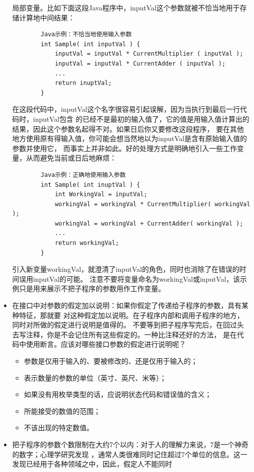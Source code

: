 \documentclass{article}
\begin{document}
\begin{itemize}
    局部变量。比如下面这段Java程序中，inputVal这个参数就被不恰当地用于存储计算地中间结果：
    \begin{lstlisting}
        Java示例：不恰当地使用输入参数
        int Sample( int inputVal ) {
            inputVal = inputVal * CurrentMultiplier ( inputVal );
            inputVal = inputVal * CurrentAdder ( inputVal );
            ...
            return inuptVal;
        }
    \end{lstlisting}
    在这段代码中，inputVal这个名字很容易引起误解，因为当执行到最后一行代码时，inputVal包含
    的已经不是最初的输入值了，它的值是用输入值计算出的结果，因此这个参数名起得不对。如果日后你又要修改这段程序，
    要在其他地方使用原有得输入值，你可能会想当然地以为inputVal是含有原始输入值的参数并使用它，
    而事实上并非如此。好的处理方式是明确地引入一些工作变量，从而避免当前或日后地麻烦：
    \begin{lstlisting}
        Java示例：正确地使用输入参数
        int Sample( int inuptVal ) {
            int WorkingVal = inputVal;
            workingVal = workingVal * CurrentMultiplier( workingVal );
            workingVal = workingVal + CurrentAdder( workingVal );
            ...
            return workingVal;
        }
    \end{lstlisting}
    引入新变量workingVal，就澄清了inputVal的角色，同时也消除了在错误的时间误用inputVal的可能。
    注意不要将变量命名为workingVal或inputVal，该示例只是用来展示不把子程序的参数用作工作变量。
    \item 在接口中对参数的假定加以说明：如果你假定了传递给子程序的参数，具有某种特征，那就要
    对这种假定加以说明。在子程序内部和调用子程序的地方，同时对所做的假定进行说明是值得的。
    不要等到把子程序写完后，在回过头去写注释，你是不会记住所有这些假定的。一种比注释还好的方法，
    是在代码中使用断言。应该对哪些接口参数的假定进行说明呢？
    \begin{itemize}
        \item 参数是仅用于输入的、要被修改的、还是仅用于输入的；
        \item 表示数量的参数的单位（英寸、英尺、米等）；
        \item 如果没有用枚举类型的话，应说明状态代码和错误值的含义；
        \item 所能接受的数值的范围；
        \item 不该出现的特定数值。
    \end{itemize}
    \item 把子程序的参数个数限制在大约7个以内：对于人的理解力来说，7是一个神奇的数字；心理学研究发现
    ，通常人类很难同时记住超过7个单位的信息。这一发现已经用于各种领域之中，因此，假定人不能同时

\end{itemize}
\end{document}
